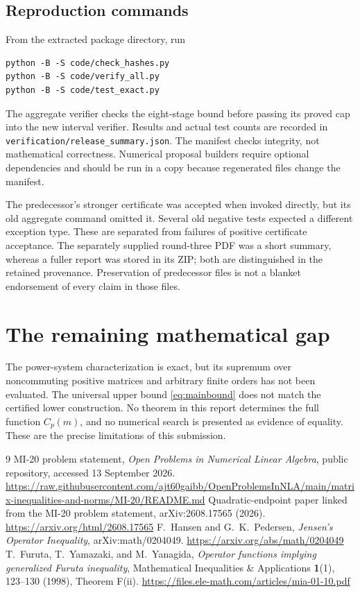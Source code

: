 \documentclass[11pt]{article}
\theoremstyle{remark}\newtheorem{remark}[theorem]{Remark}
\begin{document}
\subsection{Reproduction commands}
From the extracted package directory, run
\begin{verbatim}
python -B -S code/check_hashes.py
python -B -S code/verify_all.py
python -B -S code/test_exact.py
\end{verbatim}
The aggregate verifier checks the eight-stage bound before passing its proved cap into the new interval verifier. Results and actual test counts are recorded in \texttt{verification/release\_summary.json}. The manifest checks integrity, not mathematical correctness. Numerical proposal builders require optional dependencies and should be run in a copy because regenerated files change the manifest.

The predecessor's stronger certificate was accepted when invoked directly, but its old aggregate command omitted it. Several old negative tests expected a different exception type. These are separated from failures of positive certificate acceptance. The separately supplied round-three PDF was a short summary, whereas a fuller report was stored in its ZIP; both are distinguished in the retained provenance. Preservation of predecessor files is not a blanket endorsement of every claim in those files.

\section{The remaining mathematical gap}
The power-system characterization is exact, but its supremum over noncommuting positive matrices and arbitrary finite orders has not been evaluated. The universal upper bound \eqref{eq:mainbound} does not match the certified lower construction. No theorem in this report determines the full function \(C_p(m)\), and no numerical search is presented as evidence of equality. These are the precise limitations of this submission.

\begin{thebibliography}{9}
 MI-20 problem statement, \emph{Open Problems in Numerical Linear Algebra}, public repository, accessed 13 September 2026.\newline
\url{https://raw.githubusercontent.com/ajt60gaibb/OpenProblemsInNLA/main/matrix-inequalities-and-norms/MI-20/README.md}
 Quadratic-endpoint paper linked from the MI-20 problem statement, arXiv:2608.17565 (2026).\newline
\url{https://arxiv.org/html/2608.17565}
 F.~Hansen and G.~K.~Pedersen, \emph{Jensen's Operator Inequality}, arXiv:math/0204049.\newline
\url{https://arxiv.org/abs/math/0204049}
 T.~Furuta, T.~Yamazaki, and M.~Yanagida, \emph{Operator functions implying generalized Furuta inequality}, Mathematical Inequalities \& Applications \textbf{1}(1), 123--130 (1998), Theorem F(ii).\newline
\url{https://files.ele-math.com/articles/mia-01-10.pdf}
\end{thebibliography}
\end{document}
